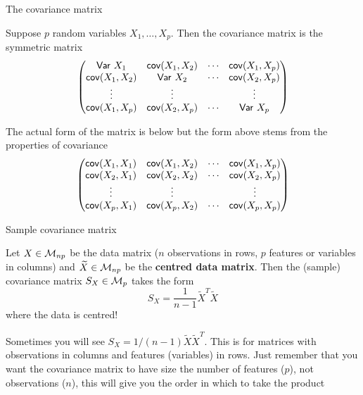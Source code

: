\documentclass[aspectratio=169]{beamer}\usepackage[]{graphicx}\usepackage[]{xcolor}
\begin{document}
\begin{frame}{The covariance matrix}
\begin{importantdefinition}
Suppose $p$ random variables $X_1,\ldots,X_p$. Then the covariance matrix is the symmetric matrix
\[
\begin{pmatrix}
\mathsf{Var}\  X_1 & \mathsf{cov}(X_1,X_2) & \cdots & \mathsf{cov}(X_1,X_p) \\
\mathsf{cov}(X_1,X_2) & \mathsf{Var}\  X_2 & \cdots & \mathsf{cov}(X_2,X_p) \\
\vdots & \vdots & & \vdots \\
\mathsf{cov}(X_1,X_p) & \mathsf{cov}(X_2,X_p) & \cdots & \mathsf{Var}\  X_p 
\end{pmatrix}
\]
\end{importantdefinition}
\vfill
The actual form of the matrix is below but the form above stems from the properties of covariance
\[
\begin{pmatrix}
\mathsf{cov}(X_1,X_1) & \mathsf{cov}(X_1,X_2) & \cdots & \mathsf{cov}(X_1,X_p) \\
\mathsf{cov}(X_2,X_1) & \mathsf{cov}(X_2,X_2) & \cdots & \mathsf{cov}(X_2,X_p) \\
\vdots & \vdots & & \vdots \\
\mathsf{cov}(X_p,X_1) & \mathsf{cov}(X_p,X_2) & \cdots & \mathsf{cov}(X_p,X_p) 
\end{pmatrix}
\]
\end{frame}

\begin{frame}{Sample covariance matrix}
\begin{importantproposition}
\label{prop:sample-covariance-matrix}
Let $X\in\mathcal{M}_{np}$ be the data matrix ($n$ observations in rows, $p$ features or variables in columns) and $\widetilde{X}\in\mathcal{M}_{np}$ be the \textbf{centred data matrix}. Then the (sample) covariance matrix $S_X\in\mathcal{M}_p$ takes the form
\[
S_X = \frac{1}{n-1}\widetilde{X}^T\widetilde{X}
\]
where the data is centred!
\end{importantproposition}
\vfill
Sometimes you will see $S_X=1/(n-1)\widetilde{X}\widetilde{X}^T$. This is for matrices with observations in columns and features (variables) in rows. Just remember that you want the covariance matrix to have size the number of features ($p$), not observations ($n$), this will give you the order in which to take the product
\end{frame}
\end{document}

